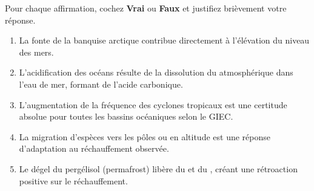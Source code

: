 \documentclass[11pt]{article}
\begin{document}
\begin{exercice}
Pour chaque affirmation, cochez \textbf{Vrai} ou \textbf{Faux} et justifiez brièvement votre réponse.
\begin{enumerate}
\item La fonte de la banquise arctique contribue directement à l'élévation du niveau des mers.
\item L'acidification des océans résulte de la dissolution du  atmosphérique dans l'eau de mer, formant de l'acide carbonique.
\item L'augmentation de la fréquence des cyclones tropicaux est une certitude absolue pour toutes les bassins océaniques selon le GIEC.
\item La migration d'espèces vers les pôles ou en altitude est une réponse d'adaptation au réchauffement observée.
\item Le dégel du pergélisol (permafrost) libère du  et du , créant une rétroaction positive sur le réchauffement.
\end{enumerate}
\end{exercice}
\end{document}
